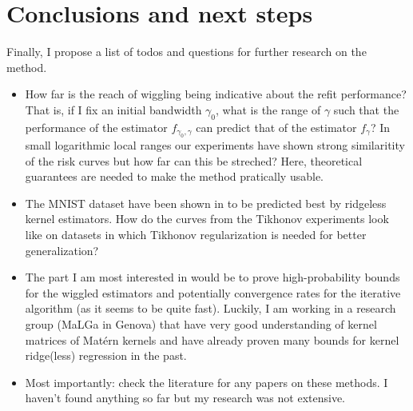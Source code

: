 \documentclass[12pt]{amsart}
\begin{document}
\section{Conclusions and next steps}

Finally, I propose a list of todos and questions for further research on 
the method.
\begin{itemize}
    \item How far is the reach of wiggling being indicative about the refit
        performance? That is, if I fix an initial bandwidth $\gamma_0$, 
        what is the range of $\gamma$ such that the performance of the 
        estimator $f_{\gamma_0, \gamma}$ can predict that of the estimator
        $f_\gamma$? In small logarithmic local ranges our experiments have
        shown strong similaritity of the risk curves but how far can this be 
        streched? Here, theoretical guarantees are needed to make the method
        pratically usable.
    \item The MNIST dataset have been shown in \cite{justinterpolate} to 
        be predicted best by ridgeless kernel estimators.
        How do the curves from the Tikhonov experiments look like on 
        datasets in which Tikhonov regularization is needed for better
        generalization?
    \item The part I am most interested in would be to prove high-probability
        bounds for the wiggled estimators and potentially convergence rates
        for the iterative algorithm (as it seems to be quite fast).
        Luckily, I am working in a research group (MaLGa in Genova) that 
        have very good understanding of kernel matrices of Matérn kernels
        and have already proven many bounds for kernel ridge(less) 
        regression in the past.
    \item Most importantly: check the literature for any papers on these
        methods. I haven't found anything so far but my research was not 
        extensive.
\end{itemize}
\end{document}
